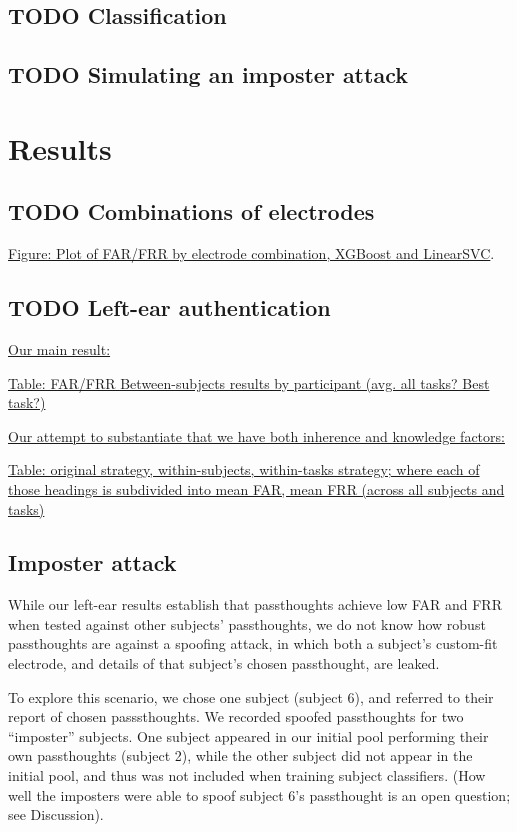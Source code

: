 \documentclass[letterpaper,twocolumn,10pt]{article}
\begin{document}
\subsection{{\bfseries\sffamily TODO} Classification}
\label{sec:org717cdb9}
\subsection{{\bfseries\sffamily TODO} Simulating an imposter attack}
\label{sec:orgdd6e8bd}
\section{Results}
\label{sec:org6705b1d}
\subsection{{\bfseries\sffamily TODO} Combinations of electrodes}
\label{sec:org21b14ae}

\underline{Figure: Plot of FAR/FRR by electrode combination, XGBoost and LinearSVC}.

\subsection{{\bfseries\sffamily TODO} Left-ear authentication}
\label{sec:org82cbcf4}

\underline{Our main result:}

\underline{Table: FAR/FRR Between-subjects results by participant (avg. all tasks? Best task?)}

\underline{Our attempt to substantiate that we have both inherence and knowledge factors:}

\underline{Table: original strategy, within-subjects, within-tasks strategy; where each of those headings is subdivided into mean FAR, mean FRR (across all subjects and tasks)}

\subsection{Imposter attack}

While our left-ear results establish that passthoughts achieve low FAR and FRR when tested against other subjects' passthoughts, we do not know how robust passthoughts are against a spoofing attack, in which both a subject's custom-fit electrode, and details of that subject's chosen passthought, are leaked. 

To explore this scenario, we chose one subject (subject 6), and referred to their report of chosen passsthoughts. We recorded spoofed passthoughts for two ``imposter'' subjects. One subject appeared in our initial pool performing their own passthoughts (subject 2), while the other subject did not appear in the initial pool, and thus was not included when training subject classifiers. (How well the imposters were able to spoof subject 6's passthought is an open question; see Discussion).
\end{document}
